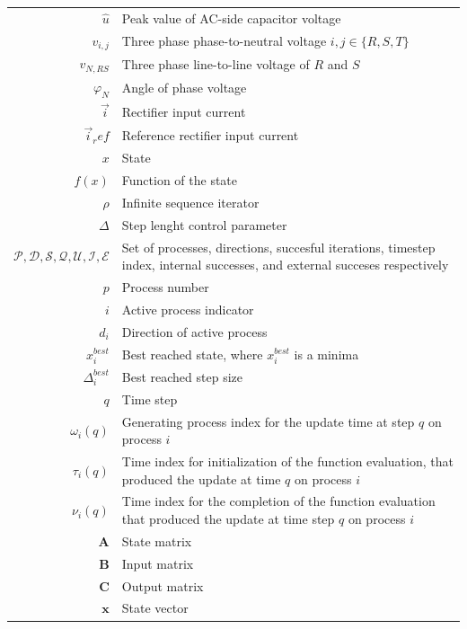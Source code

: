 \begin{tabularx}{\textwidth}{r|l}
	$\widehat{u}$											& Peak value of AC-side capacitor voltage\\
	$v_{i,j}$													& Three phase phase-to-neutral voltage $i,j\in\{R,S,T\}$\\
	$v_{N,RS}$												& Three phase line-to-line voltage of $R$ and $S$\\
	$\varphi_N$												& Angle of phase voltage\\
	$\vec{i}$													& Rectifier input current\\
	$\vec{i}_ref$											& Reference rectifier input current\\
	$x$																& State\\
	$f(x)$														& Function of the state\\
	$\rho$																& Infinite sequence iterator\\
	$\Delta$													& Step lenght control parameter\\
	$\mathcal{P},\mathcal{D},\mathcal{S},\mathcal{Q},\mathcal{U},\mathcal{I},\mathcal{E}$ & Set of processes, directions, succesful iterations, timestep index, internal successes, and external succeses respectively\\
	$p$																& Process number\\
	$i$																& Active process indicator\\
	$d_i$															& Direction of active process\\
	$x_i^{best}$											& Best reached state, where $x_i^{best}$ is a minima\\
	$\Delta_i^{best}$											& Best reached step size\\
	$q$																& Time step\\
	$\omega_i(q)$ 										& Generating process index for the update time at step $q$ on process $i$\\
	$\tau_i(q)$												& Time index for initialization of the function evaluation, that produced the update at time $q$ on process $i$\\
	$\nu_i(q)$ 												& Time index for the completion of the function evaluation that produced the update at time step $q$ on process $i$\\
	$\textbf{A}$																& State matrix\\
	$\textbf{B}$																& Input matrix\\
	$\textbf{C}$																& Output matrix\\
	$\textbf{x}$											& State vector\\

\end{tabularx}
